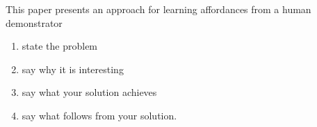 This paper presents an approach for learning affordances from a human
demonstrator

\begin{enumerate}
\def\labelenumi{\arabic{enumi}.}
\tightlist
\item
  state the problem
\item
  say why it is interesting
\item
  say what your solution achieves
\item
  say what follows from your solution.
\end{enumerate}
